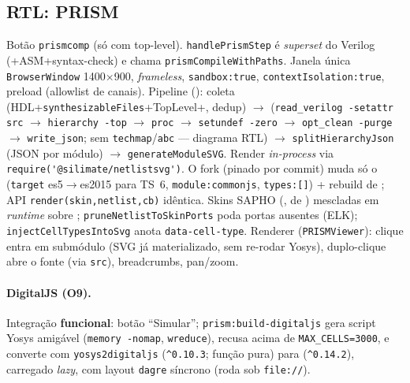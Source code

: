 \subsection{RTL: PRISM}

Botão \lstinline|prismcomp| (só com top-level). \lstinline|handlePrismStep| é \emph{superset} do Verilog (\cmm{}+ASM+syntax-check) e chama \lstinline|prismCompileWithPaths|. Janela única \lstinline|BrowserWindow| 1400$\times$900, \emph{frameless}, \lstinline|sandbox:true|, \lstinline|contextIsolation:true|, preload  (allowlist de canais). Pipeline (): coleta  (HDL+\lstinline|synthesizableFiles|+TopLevel+, dedup) $\rightarrow$  (\lstinline|read_verilog -setattr src| $\rightarrow$ \lstinline|hierarchy -top| $\rightarrow$ \lstinline|proc| $\rightarrow$ \lstinline|setundef -zero| $\rightarrow$ \lstinline|opt_clean -purge| $\rightarrow$ \lstinline|write_json|; sem \lstinline|techmap|/\lstinline|abc| — diagrama RTL) $\rightarrow$ \lstinline|splitHierarchyJson| (JSON por módulo) $\rightarrow$ \lstinline|generateModuleSVG|. Render \emph{in-process} via \lstinline|require('@silimate/netlistsvg')|. O fork  (pinado por commit) muda só o  (\lstinline|target| es5$\rightarrow$es2015 para TS~6, \lstinline|module:commonjs|, \lstinline|types:[]|) + rebuild de ; API \lstinline|render(skin,netlist,cb)| idêntica. Skins SAPHO (, de ) mescladas em \emph{runtime} sobre ; \lstinline|pruneNetlistToSkinPorts| poda portas ausentes (ELK); \lstinline|injectCellTypesIntoSvg| anota \lstinline|data-cell-type|. Renderer (\lstinline|PRISMViewer|): clique entra em submódulo (SVG já materializado, sem re-rodar Yosys), duplo-clique abre o fonte (via \lstinline|src|), breadcrumbs, pan/zoom.

\paragraph{DigitalJS (O9).} Integração \textbf{funcional}: botão \enquote{Simular}; \lstinline|prism:build-digitaljs| gera script Yosys amigável (\lstinline|memory -nomap|, \lstinline|wreduce|), recusa acima de \lstinline|MAX_CELLS=3000|, e converte com \lstinline|yosys2digitaljs| (\lstinline|^0.10.3|; função pura) para  (\lstinline|^0.14.2|), carregado \emph{lazy}, com layout \lstinline|dagre| síncrono (roda sob \lstinline|file://|).

